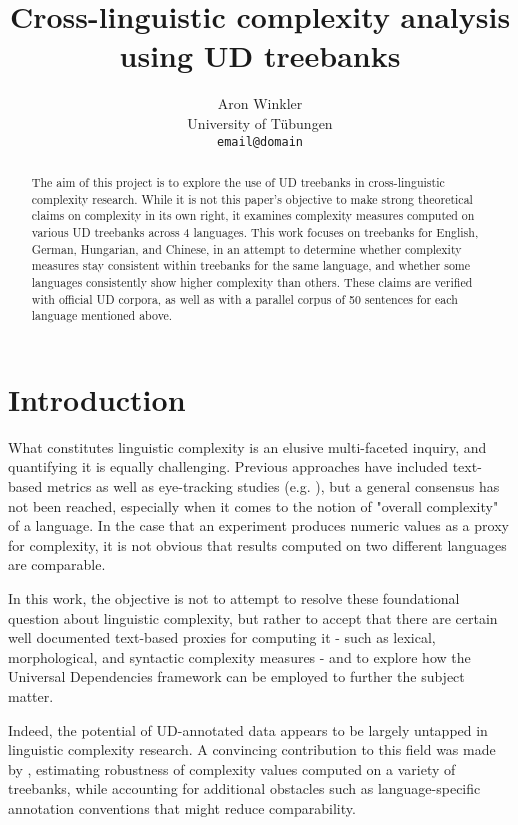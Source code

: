 \documentclass[11pt]{article}
\title{Cross-linguistic complexity analysis using UD treebanks}
\author{Aron Winkler \\
  University of Tübungen \\
  \texttt{email@domain}}
\begin{document}
\maketitle
\begin{abstract}
    The aim of this project is to explore the use of UD treebanks in cross-linguistic complexity research. While it is not this paper's objective to make strong theoretical claims on complexity in its own right, it examines complexity measures computed on various UD treebanks across 4 languages. This work focuses on treebanks for English, German, Hungarian, and Chinese, in an attempt to determine whether complexity measures stay consistent within treebanks for the same language, and whether some languages consistently show higher complexity than others.
    These claims are verified with official UD corpora, as well as with a parallel corpus of 50 sentences for each language mentioned above.
\end{abstract}

\section{Introduction}

What constitutes linguistic complexity is an elusive multi-faceted inquiry, and quantifying it is equally challenging. Previous approaches have included text-based metrics as well as eye-tracking studies (e.g. \citealp{Lee:2007}), but a general consensus has not been reached, especially when it comes to the notion of "overall complexity" of a language. In the case that an experiment produces numeric values as a proxy for complexity, it is not obvious that results computed on two different languages are comparable.

In this work, the objective is not to attempt to resolve these foundational question about linguistic complexity, but rather to accept that there are certain well documented text-based proxies for computing it - such as lexical, morphological, and syntactic complexity measures - and to explore how the Universal Dependencies framework can be employed to further the subject matter. 

Indeed, the potential of UD-annotated data appears to be largely untapped in linguistic complexity research. A convincing contribution to this field was made by \citealp{Cagri:18}, estimating robustness of complexity values computed on a variety of treebanks, while accounting for additional obstacles such as language-specific annotation conventions that might reduce comparability.
\end{document}
